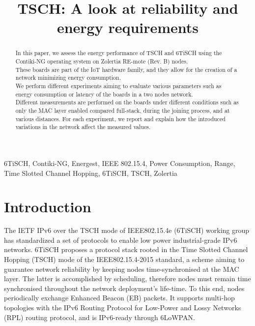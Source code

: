\documentclass[conference]{IEEEtran}
\renewcommand\_{\textunderscore\allowbreak}
\begin{document}
\title{TSCH: A look at reliability and energy requirements}

\author{
\and
{}
}

\maketitle

\begin{abstract}
In this paper, we assess the energy performance of TSCH and 6TiSCH using the Contiki-NG operating system on Zolertia RE-mote (Rev. B) nodes.\\
These boards are part of the IoT hardware family, and they allow for the creation of a network minimizing energy consumption.\\
We perform different experiments aiming to evaluate various parameters such as energy consumption or latency of the boards in a two nodes network.\\
Different measurements are performed on the boards under different conditions such as only the MAC layer enabled compared full-stack, during the joining process, and at various distances.
For each experiment, we report and explain how the introduced variations in the network affect the measured values.
\end{abstract}

\begin{IEEEkeywords}
6TiSCH, Contiki-NG, Energest, IEEE 802.15.4, Power Consumption, Range, Time Slotted Channel Hopping, 6TiSCH, TSCH, Zolertia
\end{IEEEkeywords}

\section{Introduction}
The IETF IPv6 over the TSCH mode of IEEE802.15.4e (6TiSCH) working group has standardized a set of protocols to enable low power industrial-grade IPv6 networks. 6TiSCH proposes a protocol stack rooted in the Time Slotted Channel Hopping (TSCH) mode of the IEEE802.15.4-2015 standard, a scheme aiming to guarantee network reliability by keeping nodes time-synchronised at the MAC layer. The latter is accomplished by scheduling, therefore nodes must remain time synchronised throughout the network deployment’s life-time. To this end, nodes periodically exchange Enhanced Beacon (EB) packets\cite{6tischDef}. It supports multi-hop topologies with the IPv6 Routing Protocol for Low-Power and Lossy Networks (RPL) routing protocol, and is IPv6-ready through 6LoWPAN\cite{6tischDef}.
\end{document}
